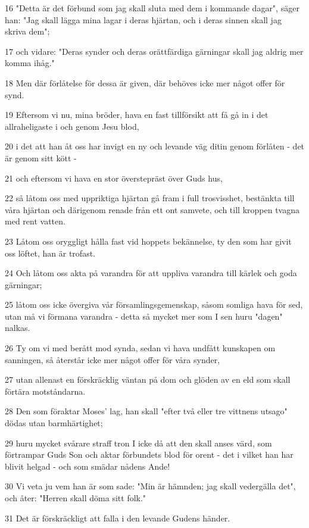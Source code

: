 \par 16 "Detta är det förbund som jag skall sluta med dem i kommande dagar", säger han: "Jag skall lägga mina lagar i deras hjärtan, och i deras sinnen skall jag skriva dem";
\par 17 och vidare: "Deras synder och deras orättfärdiga gärningar skall jag aldrig mer komma ihåg."
\par 18 Men där förlåtelse för dessa är given, där behöves icke mer något offer för synd.
\par 19 Eftersom vi nu, mina bröder, hava en fast tillförsikt att få gå in i det allraheligaste i och genom Jesu blod,
\par 20 i det att han åt oss har invigt en ny och levande väg ditin genom förlåten - det är genom sitt kött -
\par 21 och eftersom vi hava en stor överstepräst över Guds hus,
\par 22 så låtom oss med uppriktiga hjärtan gå fram i full trosvisshet, bestänkta till våra hjärtan och därigenom renade från ett ont samvete, och till kroppen tvagna med rent vatten.
\par 23 Låtom oss oryggligt hålla fast vid hoppets bekännelse, ty den som har givit oss löftet, han är trofast.
\par 24 Och låtom oss akta på varandra för att uppliva varandra till kärlek och goda gärningar;
\par 25 låtom oss icke övergiva vår församlingsgemenskap, såsom somliga hava för sed, utan må vi förmana varandra - detta så mycket mer som I sen huru "dagen" nalkas.
\par 26 Ty om vi med berått mod synda, sedan vi hava undfått kunskapen om sanningen, så återstår icke mer något offer för våra synder,
\par 27 utan allenast en förskräcklig väntan på dom och glöden av en eld som skall förtära motståndarna.
\par 28 Den som föraktar Moses' lag, han skall "efter två eller tre vittnens utsago" dödas utan barmhärtighet;
\par 29 huru mycket svårare straff tron I icke då att den skall anses värd, som förtrampar Guds Son och aktar förbundets blod för orent - det i vilket han har blivit helgad - och som smädar nådens Ande!
\par 30 Vi veta ju vem han är som sade: "Min är hämnden; jag skall vedergälla det", och åter: "Herren skall döma sitt folk."
\par 31 Det är förskräckligt att falla i den levande Gudens händer.
